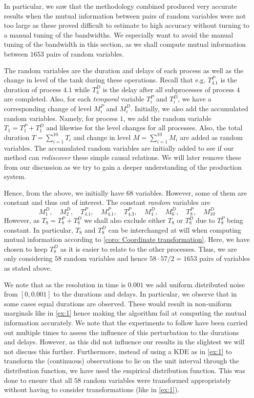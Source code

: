 \documentclass[../Thesis.tex]{subfiles}
\begin{document}
In particular, we saw that the methodology combined produced very accurate results when the mutual information between pairs of random variables were not too large as these proved difficult to estimate to high accuracy without turning to a manual tuning of the bandwidths. We especially want to avoid the manual tuning of the bandwidth in this section, as we shall compute mutual information between $1653$ pairs of random variables.

The random variables are the duration and delays of each process as well as the change in level of the tank during these operations. Recall that e.g. $T^P_{4.1}$ is the duration of process $4.1$ while $T^D_{4}$ is the delay after all subprocesses of process $4$ are completed. Also, for each \textit{temporal} variable $T^P_i$ and $T^D_i$, we have a corresponding change of level $M^P_i$ and $M^D_i$. Initially, we also add the accumulated random variables. Namely, for process $1$, we add the random variable $T_1 = T^P_1 + T^D_1$ and likewise for the level changes for all processes. Also, the total duration $T = \sum_{i=1}^{10} T_i$ and change in level $M = \sum_{i=1}^{10} M_i$ are added as random variables. The accumulated random variables are initially added to see if our method can \textit{rediscover} these simple causal relations. We will later remove these from our discussion as we try to gain a deeper understanding of the production system.

Hence, from the above, we initially have $68$ variables. However, some of them are constant and thus out of interest. The constant \textit{random} variables are
$$M^D_1,\quad  M^D_2,\quad T^P_{4.1},\quad  M^P_{4.1},\quad T^P_{4.3},\quad  M^D_4,\quad  M^D_6,\quad  T^P_8,\quad  M^D_{10}$$
However, as $T_8 = T^P_8 + T^D_8$ we shall also exclude either $T_8$ or $T^D_8$ due to $T^P_8$ being constant. In particular, $T_8$ and $T^D_8$ can be interchanged at will when computing mutual information according to \autoref{coro: Coordinate transformation}. Here, we have chosen to keep $T^D_8$ as it is easier to relate to the other processes. Thus, we are only considering $58$ random variables and hence $58 \cdot 57 / 2 = 1653$ pairs of variables as stated above.

We note that as the resolution in time is $0.001$ we add uniform distributed noise from $[0,0.001]$ to the durations and delays. In particular, we observe that in some cases equal durations are observed. These would result in non-uniform marginals like in \autoref{ex:1} hence making the algorithm fail at computing the mutual information accurately. We note that the experiments to follow have been carried out multiple times to assess the influence of this perturbation to the durations and delays. However, as this did not influence our results in the slightest we will not discuss this further. Furthermore, instead of using a KDE as in \autoref{ex:1} to transform the (continuous) observations to lie on the unit interval through the distribution function, we have used the empirical distribution function. This was done to ensure that all $58$ random variables were transformed appropriately without having to consider transformations (like in \autoref{ex:1}).
\end{document}
